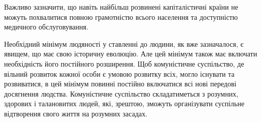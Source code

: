 \documentclass[../main]{subfiles}
\begin{document}
Важливо зазначити, що навіть найбільш розвинені капіталістичні країни не можуть похвалитися повною грамотністю всього населення та доступністю медичного обслуговування.

Необхідний мінімум людяності у ставленні до людини, як вже зазначалося, є явищем, що має свою історичну еволюцію. Але цей мінімум також має включати необхідність його постійного розширення. Щоб комуністичне суспільство, де вільний розвиток кожної особи є умовою розвитку всіх, могло існувати та розвиватися, в цей мінімум повинні постійно включатися всі нові передові досягнення людства. Комуністичне суспільство складатиметься з розумних, здорових і талановитих людей, які, зрештою, зможуть організувати суспільне відтворення свого життя на розумних засадах.
\end{document}

